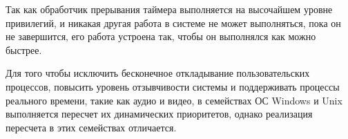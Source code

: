 Так как обработчик прерывания таймера выполняется на высочайшем уровне привилегий, и никакая другая работа в системе не может выполняться, пока он не завершится, его работа устроена так, чтобы он выполнялся как можно быстрее. 
  
Для того чтобы исключить бесконечное откладывание пользовательских процессов, повысить уровень отзывчивости системы и поддерживать процессы реального времени, такие как аудио и видео, в семействах ОС Windows и Unix выполняется пересчет их динамических приоритетов, однако реализация пересчета в этих семействах отличается. 



